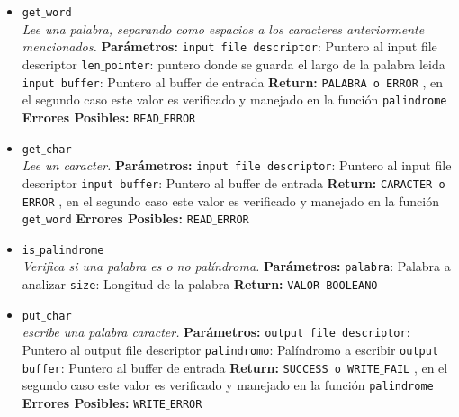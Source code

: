 \documentclass[a4paper, 10pt]{article}
\def\code#1{\texttt{#1}}
\begin{document}
\begin{itemize}
				\item \code{get$\_$word}
				\\\textit{Lee una palabra, separando como espacios a los caracteres anteriormente mencionados.}
					\subitem \textbf{Parámetros:}
						\subsubitem \code{input file descriptor}: Puntero al input file descriptor
						\subsubitem \code{len$\_$pointer}: puntero donde se guarda el largo de la palabra leida
						\subsubitem \code{input buffer}: Puntero al buffer de entrada
					\subitem \textbf{Return:}
						\subsubitem \code{PALABRA o ERROR} , en el segundo caso este valor
						es verificado y manejado en la función \code{palindrome}
					\subitem \textbf{Errores Posibles:}
						\subsubitem \code{READ$\_$ERROR}
				
				\item \code{get$\_$char}
				\\\textit{Lee un caracter.}
					\subitem \textbf{Parámetros:}
						\subsubitem \code{input file descriptor}: Puntero al input file descriptor
						\subsubitem \code{input buffer}: Puntero al buffer de entrada
					\subitem \textbf{Return:}
						\subsubitem \code{CARACTER o ERROR} , en el segundo caso este valor
						es verificado y manejado en la función \code{get$\_$word}
					\subitem \textbf{Errores Posibles:}
						\subsubitem \code{READ$\_$ERROR}
						
				\item \code{is$\_$palindrome}
				\\\textit{Verifica si una palabra es o no palíndroma.}
					\subitem \textbf{Parámetros:}
						\subsubitem \code{palabra}: Palabra a analizar
						\subsubitem \code{size}: Longitud de la palabra
					\subitem \textbf{Return:}
						\subsubitem \code{VALOR BOOLEANO}
						
				\item \code{put$\_$char}
				\\\textit{escribe una palabra caracter.}
					\subitem \textbf{Parámetros:}
						\subsubitem \code{output file descriptor}: Puntero al output file descriptor
						\subsubitem \code{palindromo}: Palíndromo a escribir
						\subsubitem \code{output buffer}: Puntero al buffer de entrada
					\subitem \textbf{Return:}
						\subsubitem \code{SUCCESS o WRITE$\_$FAIL} , en el segundo caso este valor
						es verificado y manejado en la función \code{palindrome}
					\subitem \textbf{Errores Posibles:}
						\subsubitem \code{WRITE$\_$ERROR}																
			\end{itemize}
			
\end{document}

